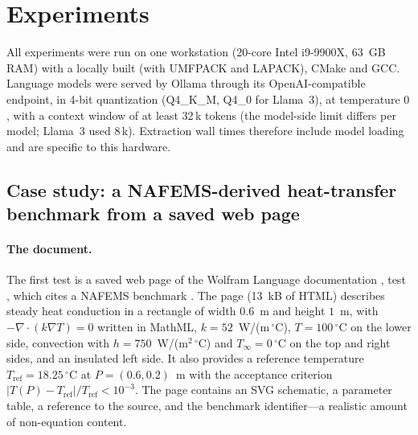 \section{Experiments}
\label{sec:experiments}

All experiments were run on one workstation (20-core Intel i9-9900X, 63~GB RAM) with a locally built \dealii{} (with UMFPACK and LAPACK), CMake and GCC. Language models were served by Ollama \citep{ollama} through its OpenAI-compatible endpoint, in 4-bit quantization (Q4\_K\_M, Q4\_0 for Llama~3), at temperature $0$, with a context window of at least 32\,k tokens (the model-side limit differs per model; Llama~3 used $8$\,k). Extraction wall times therefore include model loading and are specific to this hardware.

\subsection{Case study: a NAFEMS-derived heat-transfer benchmark from a saved web page}
\label{sec:heat}

\paragraph{The document.} The first test is a saved web page of the Wolfram Language documentation \citep{wolframheat}, test , which cites a NAFEMS benchmark \citep{nafemsheat}. The page (13~kB of HTML) describes steady heat conduction in a rectangle of width $0.6$~m and height $1$~m, with $-\nabla\cdot(k\nabla T)=0$ written in MathML, $k=52$~W/(m\,$^\circ$C), $T=100\,^\circ$C on the lower side, convection with $h=750$~W/(m$^2\,^\circ$C) and $T_\infty=0\,^\circ$C on the top and right sides, and an insulated left side. It also provides a reference temperature $T_{\mathrm{ref}}=18.25\,^\circ$C at $P=(0.6,0.2)$~m with the acceptance criterion $|T(P)-T_{\mathrm{ref}}|/T_{\mathrm{ref}}<10^{-3}$. The page contains an SVG schematic, a parameter table, a reference to the source, and the benchmark identifier---a realistic amount of non-equation content.

